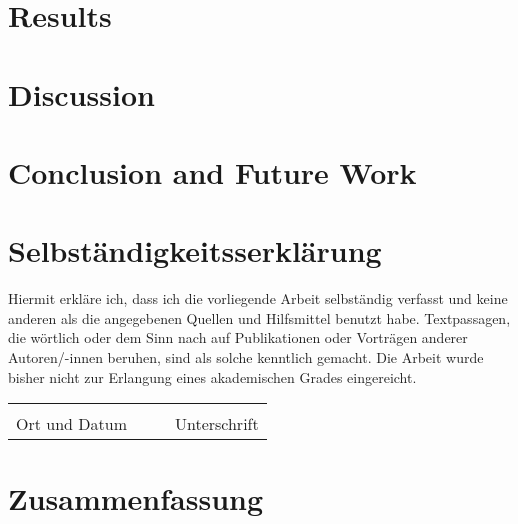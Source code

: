 \lipsum[1-4]

\chapter{Results}
\label{ch:results}

\lipsum[1-4]

\chapter{Discussion}
\label{ch:discussion}

\lipsum[1-4]

\chapter{Conclusion and Future Work}
\label{ch:conclusion}

\lipsum[1-4]

\listoffigures
 
\listoftables




\begin{appendices}

\chapter{Selbständigkeitsserklärung}
	
\vspace{1cm}
\noindent	
Hiermit erkläre ich, dass ich die vorliegende Arbeit selbständig verfasst und keine anderen als die angegebenen Quellen und Hilfsmittel benutzt habe.
Textpassagen, die wörtlich oder dem Sinn nach auf Publikationen oder Vorträgen anderer Autoren/-innen beruhen, sind als solche kenntlich gemacht.
Die Arbeit wurde bisher nicht zur Erlangung eines akademischen Grades eingereicht. 
	
\vspace{1.5cm}
	
\noindent\begin{tabularx}{\textwidth}{XXXX}
	&&& \\
	\cline{1-1}\cline{4-4}\footnotesize\centering Ort und Datum		&&& \footnotesize\centering Unterschrift
\end{tabularx}
	
\newpage

\chapter{Zusammenfassung}


\lipsum[1-4]

\end{appendices}
 
\backmatter


